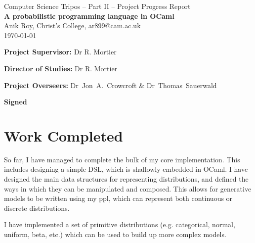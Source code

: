 \documentclass[12pt,a4paper]{article}
\begin{document}
\begin{center}
	{\Large Computer Science Tripos -- Part II -- Project Progress Report} \\
	\vspace{0.2in}
	{\huge \bf A probabilistic programming language in OCaml } \\
	\vspace{0.4in}
	{\large Anik Roy, Christ's College, ar899@cam.ac.uk} \\
	\vspace{0.1in}
	{\large \today} \\
																																					
\end{center}
\vspace{0.4in}


\vfil



\textbf{Project Supervisor:} Dr R. Mortier

\textbf{Director of Studies:} Dr R. Mortier

\textbf{Project Overseers:} Dr~Jon~A.~Crowcroft  \& Dr~Thomas~Sauerwald

\vfil

\noindent\textbf{Signed} 

\section*{Work Completed}

So far, I have managed to complete the bulk of my core implementation. This includes designing a simple DSL, which is shallowly embedded in OCaml. I have designed the main data structures for representing distributions, and defined the ways in which they can be manipulated and composed. This allows for generative models to be written using my ppl, which can represent both continuous or discrete distributions. 

I have implemented a set of primitive distributions (e.g. categorical, normal, uniform, beta, etc.) which can be used to build up more complex models.
\end{document}
